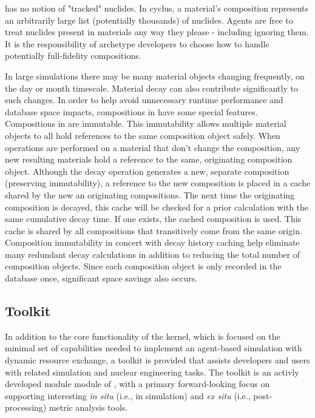 \Cyclus has no notion of "tracked" nuclides.  In cyclus, a  material's
composition represents an arbitrarily large list (potentially thousands) of
nuclides.  Agents are free to treat nuclides present in materials any way they
please - including ignoring them.  It is the responsibility of archetype
developers to choose how to handle potentially full-fidelity compositions.

In large simulations there may be many material objects changing frequently, on 
the day or month timescale.
Material decay can also contribute significantly to such changes.  In order to
help avoid unnecessary runtime performance and database space impacts,
compositions in \Cyclus have some special features.  Compositions in \Cyclus are
immutable.  This immutability allows multiple material objects to all hold
references to the same composition object safely.  When operations are
performed on a material that don't change the composition, any new resulting
materials hold a reference to the same, originating composition object.
Although the decay operation generates a new, separate composition (preserving
immutability), a reference to the new composition is placed in a cache shared
by the new an originating compositions. The next time the originating
composition is decayed, this cache will be checked for a prior calculation
with the same cumulative decay time.  If one exists, the cached composition is
used.  This cache is shared by all compositions that transitively come from
the same origin.  Composition immutability in concert with decay history
caching help eliminate many redundant decay calculations in addition to
reducing the total number of composition objects.  Since each composition
object is only recorded in the database once, significant space savings also
occurs. 

\subsection{Toolkit}

In addition to the core functionality of the \Cyclus kernel, which is focused on
the minimal set of capabilities needed to implement an agent-based simulation
with dynamic resource exchange, a toolkit is provided that assists developers
and users with related simulation and nuclear engineering tasks. The toolkit is
an activly developed module module of \Cyclus, with a primary forward-looking
focus on supporting interesting \textit{in situ} (i.e., in simulation) and
\textit{ex situ} (i.e., post-processing) metric analysis tools. 

